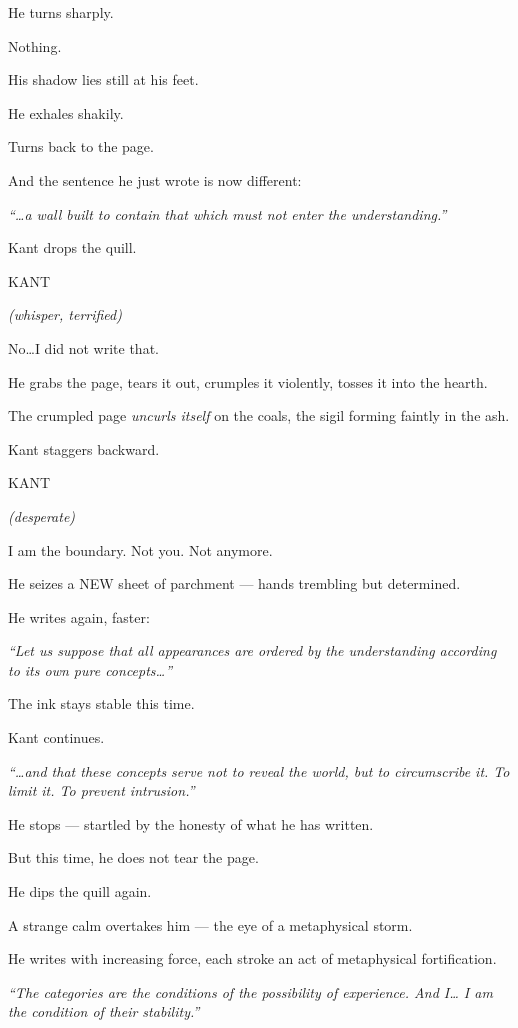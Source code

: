 \documentclass[12pt]{article}
\newenvironment{dialogue}[1]{%
  \vspace{0.8\baselineskip}%
  \noindent\hspace*{2.3in}\textsc{#1}\par%
  \noindent\hspace*{1.5in}\begin{minipage}[t]{4.5in}%
}{%
  \end{minipage}\par%
}
\newcommand{\paren}[1]{%
  \noindent\hspace*{1.8in}\textit{(#1)}\par%
}
\begin{document}
He turns sharply.

Nothing.

His shadow lies still at his feet.

He exhales shakily.

Turns back to the page.

And the sentence he just wrote is now different:

\textit{“…a wall built to contain that which must not enter the
understanding.”}

Kant drops the quill.

\begin{dialogue}{KANT}
\paren{whisper, terrified}
No\ldots I did not write that.
\end{dialogue}

He grabs the page, tears it out, crumples it violently, tosses it into
the hearth.

The crumpled page \textit{uncurls itself} on the coals, the sigil
forming faintly in the ash.

Kant staggers backward.

\begin{dialogue}{KANT}
\paren{desperate}
I am the boundary.  
Not you. Not anymore.
\end{dialogue}

He seizes a NEW sheet of parchment — hands trembling but determined.

He writes again, faster:

\textit{“Let us suppose that all appearances are ordered by the
understanding according to its own pure concepts\ldots”}

The ink stays stable this time.

Kant continues.

\textit{“…and that these concepts serve not to reveal the world, but to
circumscribe it. To limit it. To prevent intrusion.”}

He stops — startled by the honesty of what he has written.

But this time, he does not tear the page.

He dips the quill again.

A strange calm overtakes him — the eye of a metaphysical storm.

He writes with increasing force, each stroke an act of metaphysical
fortification.

\textit{
“The categories are the conditions of the possibility of experience.
And I\ldots  
I am the condition of their stability.”}
\end{document}
